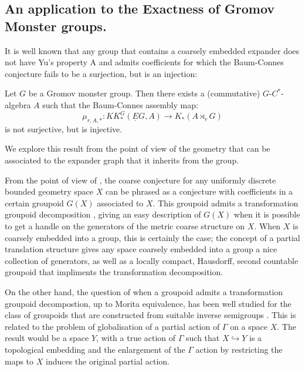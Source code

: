\begin{example}
\section{An application to the Exactness of Gromov Monster groups.}

It is well known \cite{MR1911663,explg1} that any group that contains a coarsely embedded expander does not have Yu's property A and admits coefficients for which the Baum-Connes conjecture fails to be a surjection, but is an injection:

\begin{theorem}\label{Thm:IT1}
Let $G$ be a Gromov monster group. Then there exists a (commutative) $G$-$C^{*}$-algebra $A$ such that the Baum-Connes assembly map:
\begin{equation*}
\mu_{r,A,*}: KK^{G}_{*}(\underline{E}G, A) \rightarrow K_{*}(A\rtimes_{r}G)
\end{equation*}
is not surjective, but is injective.
\end{theorem}

We explore this result from the point of view of the geometry that can be associated to the expander graph that it inherits from the group.

From the point of view of \cite{MR1905840}, the coarse conjecture for any uniformly discrete bounded geometry space $X$ can be phrased as a conjecture with coefficients in a certain groupoid $G(X)$ associated to $X$. This groupoid admits a transformation groupoid decomposition \cite[Lemma 3.3b)]{MR1905840}, giving an easy description of $G(X)$ when it is possible to get a handle on the generators of the metric coarse structure on $X$. When $X$ is coarsely embedded into a group, this is certainly the case; the concept of a partial translation structure \cite{MR2363428} gives any space coarsely embedded into a group a nice collection of generators, as well as a locally compact, Hausdorff, second countable \etale groupoid that impliments the transformation decomposition.

On the other hand, the question of when a groupoid admits a transformation groupoid decompostion, up to Morita equivalence, has been well studied for the class of groupoids that are constructed from suitable inverse semigroups \cite{MR1900993,Milan-Steinberg}. This is related to the problem of globalisation of a partial action of $\Gamma$ on a space $X$. The result would be a space $Y$, with a true action of $\Gamma$ such that $X \hookrightarrow Y$ is a topological embedding and the enlargement of the $\Gamma$ action by restricting the maps to $X$ induces the original partial action.


\end{example}
